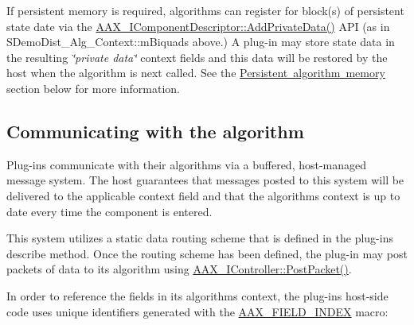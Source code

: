  If persistent memory is required, algorithms can register for block(s) of persistent state date via the \mbox{\hyperlink{a01781_a125949841a13e97ff93fa321f2050433}{A\+A\+X\+\_\+\+I\+Component\+Descriptor\+::\+Add\+Private\+Data()}} A\+PI (as in S\+Demo\+Dist\+\_\+\+Alg\+\_\+\+Context\+::m\+Biquads above.) A plug-\/in may store state data in the resulting {\itshape \char`\"{}private data\char`\"{}} context fields and this data will be restored by the host when the algorithm is next called. See the \mbox{\hyperlink{a00797_alg_pd}{Persistent algorithm memory}} section below for more information. 

 \hypertarget{a00797_alg_comm}{}\subsection{Communicating with the algorithm}\label{a00797_alg_comm}
 Plug-\/ins communicate with their algorithms via a buffered, host-\/managed message system. The host guarantees that messages posted to this system will be delivered to the applicable context field and that the algorithm\textquotesingle{}s context is up to date every time the component is entered.

 This system utilizes a static data routing scheme that is defined in the plug-\/in\textquotesingle{}s describe method. Once the routing scheme has been defined, the plug-\/in may post packets of data to its algorithm using \mbox{\hyperlink{a01789_ae5dd2b5925dbc181513bca1c4ac5e716}{A\+A\+X\+\_\+\+I\+Controller\+::\+Post\+Packet()}}.

 In order to reference the fields in its algorithm\textquotesingle{}s context, the plug-\/in\textquotesingle{}s host-\/side code uses unique identifiers generated with the \mbox{\hyperlink{a00392_acf807247ecd6e5899dc9dc31644e9a1d}{A\+A\+X\+\_\+\+F\+I\+E\+L\+D\+\_\+\+I\+N\+D\+EX}} macro\+:



